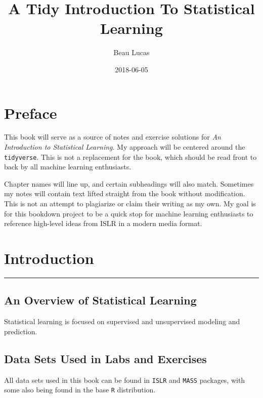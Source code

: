 \documentclass[]{book}
\title{A Tidy Introduction To Statistical Learning}
\author{Beau Lucas}
\date{2018-06-05}
\theoremstyle{definition}
\theoremstyle{definition}
\theoremstyle{definition}
\theoremstyle{remark}
\begin{document}
\maketitle

{
\setcounter{tocdepth}{1}
\tableofcontents
}
\chapter*{Preface}\label{preface}

This book will serve as a source of notes and exercise solutions for
\emph{An Introduction to Statistical Learning}. My approach will be
centered around the \texttt{tidyverse}. This is not a replacement for
the book, which should be read front to back by all machine learning
enthusiasts.

Chapter names will line up, and certain subheadings will also match.
Sometimes my notes will contain text lifted straight from the book
without modification. This is not an attempt to plagiarize or claim
their writing as my own. My goal is for this bookdown project to be a
quick stop for machine learning enthusiasts to reference high-level
ideas from ISLR in a modern media format.

\chapter{Introduction}\label{intro}

\begin{center}\rule{0.5\linewidth}{\linethickness}\end{center}

\section{An Overview of Statistical
Learning}\label{an-overview-of-statistical-learning}

Statistical learning is focused on supervised and unsupervised modeling
and prediction.

\section{Data Sets Used in Labs and
Exercises}\label{data-sets-used-in-labs-and-exercises}

All data sets used in this book can be found in \texttt{ISLR} and
\texttt{MASS} packages, with some also being found in the base
\texttt{R} distribution.
\end{document}
